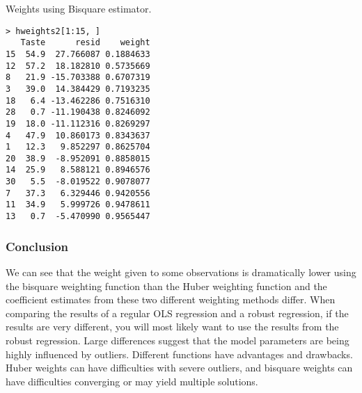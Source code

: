 \documentclass[main.tex]{subfiles}
\begin{document}


Weights using Bisquare estimator.

\begin{verbatim}
> hweights2[1:15, ]
   Taste      resid    weight
15  54.9  27.766087 0.1884633
12  57.2  18.182810 0.5735669
8   21.9 -15.703388 0.6707319
3   39.0  14.384429 0.7193235
18   6.4 -13.462286 0.7516310
28   0.7 -11.190438 0.8246092
19  18.0 -11.112316 0.8269297
4   47.9  10.860173 0.8343637
1   12.3   9.852297 0.8625704
20  38.9  -8.952091 0.8858015
14  25.9   8.588121 0.8946576
30   5.5  -8.019522 0.9078077
7   37.3   6.329446 0.9420556
11  34.9   5.999726 0.9478611
13   0.7  -5.470990 0.9565447
\end{verbatim}

\subsubsection{Conclusion}
We can see that the weight given to some observations is dramatically lower using the bisquare weighting function than the Huber weighting function and the coefficient estimates from these two different weighting methods differ. 
When comparing the results of a regular OLS regression and a robust regression, if the results are very different, you will most likely want to use the results from the robust regression. 
Large differences suggest that the model parameters are being highly influenced by outliers. Different functions have advantages and drawbacks. Huber weights can have difficulties with severe outliers, and bisquare weights can have difficulties converging or may yield multiple solutions. 
\end{document}
